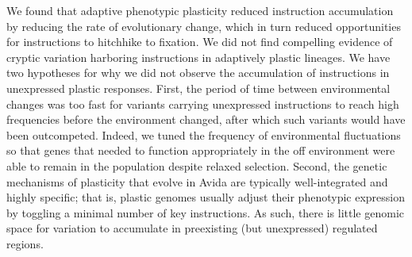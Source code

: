 
We found that adaptive phenotypic plasticity reduced  instruction accumulation by reducing the rate of evolutionary change, which in turn reduced opportunities for  instructions to hitchhike to fixation.
We did not find compelling evidence of cryptic variation harboring  instructions in adaptively plastic lineages.
We have two hypotheses for why we did not observe the accumulation of  instructions in unexpressed plastic responses.
First, the period of time between environmental changes was too fast for variants carrying unexpressed  instructions to reach high frequencies before the environment changed, after which such variants would have been outcompeted.
Indeed, we tuned the frequency of environmental fluctuations so that genes that needed to function appropriately in the off environment were able to remain in the population despite relaxed selection.
Second, the genetic mechanisms of plasticity that evolve in Avida are typically well-integrated and highly specific; that is, plastic genomes usually adjust their phenotypic expression by toggling a minimal number of key instructions. 
As such, there is little genomic space for variation to accumulate in preexisting (but unexpressed) regulated regions.



\vspace{0.25cm}
